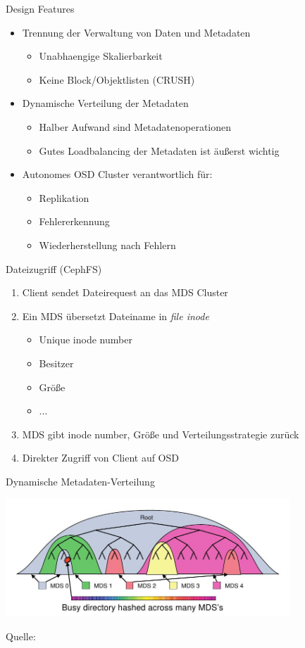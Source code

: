 \documentclass[hyperref={xetex}]{beamer}
\begin{document}
\begin{frame}{Design Features}
	\begin{itemize}
		\item Trennung der Verwaltung von Daten und Metadaten
		\begin{itemize}
			\item Unabhaengige Skalierbarkeit
			\item Keine Block/Objektlisten (CRUSH)
		\end{itemize}
		\item  Dynamische Verteilung der Metadaten
		\begin{itemize}
			\item Halber Aufwand sind Metadatenoperationen
			\item Gutes Loadbalancing der Metadaten ist \"außerst wichtig %
		\end{itemize}
		\item Autonomes OSD Cluster verantwortlich f\"ur:
			\begin{itemize}
				\item Replikation
				\item Fehlererkennung
				\item Wiederherstellung nach Fehlern
			\end{itemize}
	\end{itemize}	
\end{frame}

\begin{frame}{Dateizugriff (CephFS)}

\begin{enumerate}
	\item Client sendet Dateirequest an das MDS Cluster
	\item Ein MDS \"ubersetzt Dateiname in \textit{file inode}
	\begin{itemize}
		\item Unique inode number
		\item Besitzer
		\item Gr\"oße
		\item ...
	\end{itemize}
	\item MDS gibt inode number, Gr\"oße und Verteilungsstrategie zur\"uck
	\item Direkter Zugriff von Client auf OSD
\end{enumerate}
\end{frame}

\begin{frame}{Dynamische Metadaten-Verteilung}
	\begin{center}
		\includegraphics[width=0.8\textwidth]{images/mds.jpg}
	\end{center}
    Quelle: \cite{weil_ceph:_2006}
\end{frame}
\end{document}
